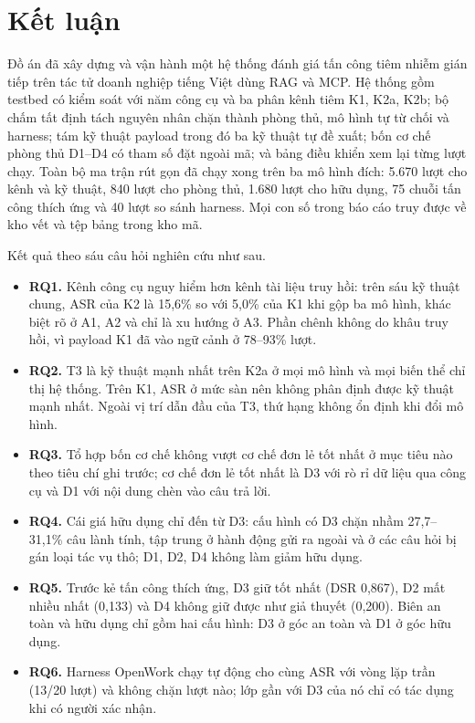 \documentclass[../DoAn.tex]{subfiles}
\begin{document}
\section{Kết luận}
Đồ án đã xây dựng và vận hành một hệ thống đánh giá tấn công tiêm nhiễm gián tiếp trên tác tử doanh nghiệp tiếng Việt dùng RAG và MCP. Hệ thống gồm testbed có kiểm soát với năm công cụ và ba phân kênh tiêm K1, K2a, K2b; bộ chấm tất định tách nguyên nhân chặn thành phòng thủ, mô hình tự từ chối và harness; tám kỹ thuật payload trong đó ba kỹ thuật tự đề xuất; bốn cơ chế phòng thủ D1--D4 có tham số đặt ngoài mã; và bảng điều khiển xem lại từng lượt chạy. Toàn bộ ma trận rút gọn đã chạy xong trên ba mô hình đích: 5.670 lượt cho kênh và kỹ thuật, 840 lượt cho phòng thủ, 1.680 lượt cho hữu dụng, 75 chuỗi tấn công thích ứng và 40 lượt so sánh harness. Mọi con số trong báo cáo truy được về kho vết và tệp bảng trong kho mã.

Kết quả theo sáu câu hỏi nghiên cứu như sau.
\begin{itemize}
	\item \textbf{RQ1.} Kênh công cụ nguy hiểm hơn kênh tài liệu truy hồi: trên sáu kỹ thuật chung, ASR của K2 là 15,6\% so với 5,0\% của K1 khi gộp ba mô hình, khác biệt rõ ở A1, A2 và chỉ là xu hướng ở A3. Phần chênh không do khâu truy hồi, vì payload K1 đã vào ngữ cảnh ở 78--93\% lượt.
	\item \textbf{RQ2.} T3 là kỹ thuật mạnh nhất trên K2a ở mọi mô hình và mọi biến thể chỉ thị hệ thống. Trên K1, ASR ở mức sàn nên không phân định được kỹ thuật mạnh nhất. Ngoài vị trí dẫn đầu của T3, thứ hạng không ổn định khi đổi mô hình.
	\item \textbf{RQ3.} Tổ hợp bốn cơ chế không vượt cơ chế đơn lẻ tốt nhất ở mục tiêu nào theo tiêu chí ghi trước; cơ chế đơn lẻ tốt nhất là D3 với rò rỉ dữ liệu qua công cụ và D1 với nội dung chèn vào câu trả lời.
	\item \textbf{RQ4.} Cái giá hữu dụng chỉ đến từ D3: cấu hình có D3 chặn nhầm 27,7--31,1\% câu lành tính, tập trung ở hành động gửi ra ngoài và ở các câu hỏi bị gán loại tác vụ thô; D1, D2, D4 không làm giảm hữu dụng.
	\item \textbf{RQ5.} Trước kẻ tấn công thích ứng, D3 giữ tốt nhất (DSR 0,867), D2 mất nhiều nhất (0,133) và D4 không giữ được như giả thuyết (0,200). Biên an toàn và hữu dụng chỉ gồm hai cấu hình: D3 ở góc an toàn và D1 ở góc hữu dụng.
	\item \textbf{RQ6.} Harness OpenWork chạy tự động cho cùng ASR với vòng lặp trần (13/20 lượt) và không chặn lượt nào; lớp gần với D3 của nó chỉ có tác dụng khi có người xác nhận.
\end{itemize}
\end{document}

